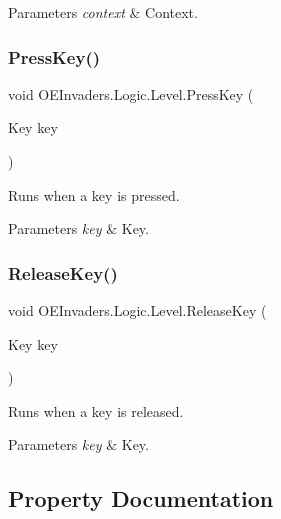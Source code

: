 \begin{DoxyParams}{Parameters}
{\em context} & Context.\\
\hline
\end{DoxyParams}
\mbox{\label{class_o_e_invaders_1_1_logic_1_1_level_aedff2825d8a03a6a89c125b7e6768d04}} 
\subsubsection{\texorpdfstring{PressKey()}{PressKey()}}
{\footnotesize\ttfamily void O\+E\+Invaders.\+Logic.\+Level.\+Press\+Key (\begin{DoxyParamCaption}\item[{Key}]{key }\end{DoxyParamCaption})}



Runs when a key is pressed. 


\begin{DoxyParams}{Parameters}
{\em key} & Key.\\
\hline
\end{DoxyParams}
\mbox{\label{class_o_e_invaders_1_1_logic_1_1_level_acb1b2317e86246597e12a98705c17659}} 
\subsubsection{\texorpdfstring{ReleaseKey()}{ReleaseKey()}}
{\footnotesize\ttfamily void O\+E\+Invaders.\+Logic.\+Level.\+Release\+Key (\begin{DoxyParamCaption}\item[{Key}]{key }\end{DoxyParamCaption})}



Runs when a key is released. 


\begin{DoxyParams}{Parameters}
{\em key} & Key.\\
\hline
\end{DoxyParams}


\subsection{Property Documentation}
\mbox{\label{class_o_e_invaders_1_1_logic_1_1_level_a374f36718ffeced4c7cfc8c0b00ea9bd}} 
